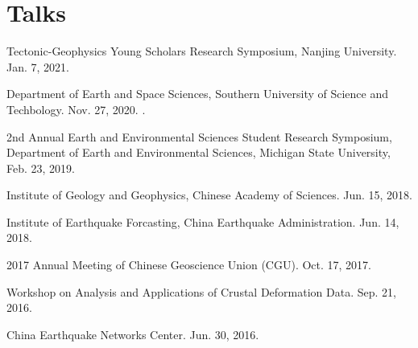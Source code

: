 \section*{Talks}
\begin{etaremune}
\item
	Tectonic-Geophysics Young Scholars Research Symposium, Nanjing University.
	Jan. 7, 2021.
\item
	Department of Earth and Space Sciences, Southern University of Science and Techbology.
	Nov. 27, 2020. \invited.
\item
    2nd Annual Earth and Environmental Sciences Student Research Symposium,
    Department of Earth and Environmental Sciences, Michigan State University,
    Feb. 23, 2019.
\item
    Institute of Geology and Geophysics, Chinese Academy of Sciences.
    Jun. 15, 2018. \invited
\item
    Institute of Earthquake Forcasting, China Earthquake Administration.
    Jun. 14, 2018.
\item
    2017 Annual Meeting of Chinese Geoscience Union (CGU).
    Oct. 17, 2017. \invited
\item
    Workshop on Analysis and Applications of Crustal Deformation Data.
    Sep. 21, 2016. \invited
\item
    China Earthquake Networks Center.
    Jun. 30, 2016. \invited
\end{etaremune}

